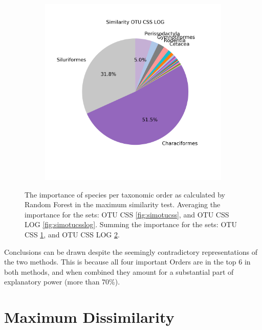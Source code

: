 \begin{figure}[h]
\begin{subfigure}{0.45\textwidth}
	\caption{}
	\label{fig:simsumotucss}
	\end{subfigure}
	\begin{subfigure}{0.45\textwidth}
	\includegraphics[width=\textwidth]{rfr_sim_sum_pieOTU CSS LOG}
	\caption{}
	\label{fig:simsumotucsslog}
	\end{subfigure}

		\caption{The importance of species per taxonomic order as calculated by Random Forest in the maximum similarity test. Averaging the importance for the sets: OTU CSS \ref{fig:simotucss}, and OTU CSS LOG \ref{fig:simotucsslog}. Summing the importance for the sets: OTU CSS \ref{fig:simsumotucss}, and OTU CSS LOG \ref{fig:simsumotucsslog}. }
	\label{fig:simpie}
\end{figure}

Conclusions can be drawn despite the seemingly contradictory representations of the two methods. This is because all four important Orders are in the top 6 in both methods, and when combined they amount for a substantial part of explanatory power (more than 70\%).    


\section{Maximum Dissimilarity}

